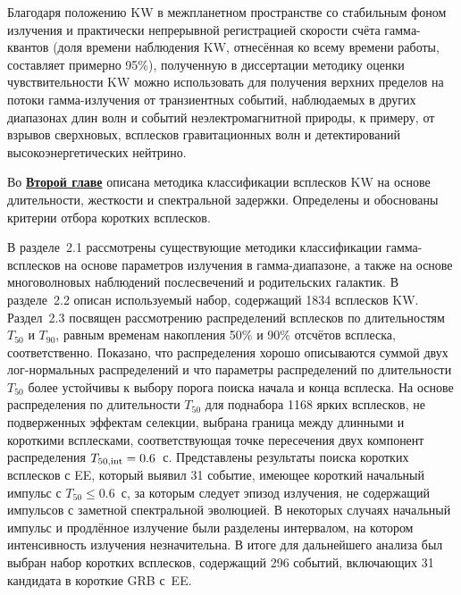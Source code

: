 Благодаря положению KW в межпланетном пространстве со стабильным 
фоном излучения и практически непрерывной регистрацией скорости счёта гамма-квантов 
(доля времени наблюдения KW, отнесённая ко всему времени работы, составляет 
примерно 95\%), полученную в диссертации методику оценки чувствительности KW
можно использовать для получения верхних пределов на потоки гамма-излучения  
от транзиентных событий, наблюдаемых в других диапазонах длин волн и событий 
неэлектромагнитной природы, к примеру, от взрывов сверхновых, 
всплесков гравитационных волн и детектирований высокоэнергетических нейтрино.

Во \underline{\textbf{Второй главе}} описана методика классификации всплесков 
KW на основе длительности, жесткости и спектральной задержки. 
Определены и обоснованы критерии отбора коротких всплесков.

В разделе~2.1 рассмотрены существующие методики классификации гамма-всплесков на основе 
параметров излучения в гамма-диапазоне, а также на основе многоволновых наблюдений 
послесвечений и родительских галактик. В разделе~2.2 описан используемый набор, содержащий 1834 всплесков KW.
Раздел~2.3 посвящен рассмотрению распределений всплесков по длительностям $T_{50}$ и $T_{90}$, 
равным временам накопления 50\% и 90\% отсчётов всплеска, соответственно. Показано,
что распределения хорошо описываются суммой двух лог-нормальных распределений и 
что параметры распределений по длительности $T_{50}$ более устойчивы к выбору 
порога поиска начала и конца всплеска. На основе распределения по длительности 
$T_{50}$ для поднабора 1168 ярких всплесков,
не подверженных эффектам селекции, выбрана граница между длинными и  короткими всплесками, 
соответствующая точке пересечения двух компонент распределения $T_{50{\mathrm{,int}}} = 0.6$~с.
Представлены результаты поиска коротких всплесков с EE, который выявил 31
событие, имеющее короткий начальный импульс с $T_{50} \le 0.6$~с, за
которым следует эпизод излучения, не содержащий импульсов с заметной
спектральной эволюцией. В некоторых случаях начальный импульс и продлённое
излучение были разделены интервалом, на котором интенсивность излучения незначительна.
В итоге для дальнейшего анализа был выбран набор коротких всплесков, содержащий 296 событий, 
включающих 31 кандидата в короткие GRB с~EE.  

